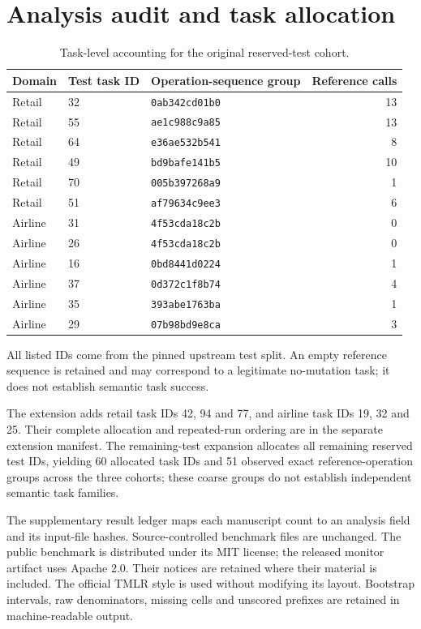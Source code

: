 \section{Analysis audit and task allocation}
\begin{table}[htbp]\centering\caption{Task-level accounting for the original reserved-test cohort.}\label{tab:earlier-tasks}
\begin{center}
\begin{tabular}{lllr}
\toprule
Domain & Test task ID & Operation-sequence group & Reference calls\\
\midrule
Retail & 32 & \texttt{0ab342cd01b0} & 13\\
Retail & 55 & \texttt{ae1c988c9a85} & 13\\
Retail & 64 & \texttt{e36ae532b541} & 8\\
Retail & 49 & \texttt{bd9bafe141b5} & 10\\
Retail & 70 & \texttt{005b397268a9} & 1\\
Retail & 51 & \texttt{af79634c9ee3} & 6\\
Airline & 31 & \texttt{4f53cda18c2b} & 0\\
Airline & 26 & \texttt{4f53cda18c2b} & 0\\
Airline & 16 & \texttt{0bd8441d0224} & 1\\
Airline & 37 & \texttt{0d372c1f8b74} & 4\\
Airline & 35 & \texttt{393abe1763ba} & 1\\
Airline & 29 & \texttt{07b98bd9e8ca} & 3\\
\bottomrule
\end{tabular}
\end{center}
All listed IDs come from the pinned upstream test split. An empty reference sequence is retained and may correspond to a legitimate no-mutation task; it does not establish semantic task success.

\end{table}
The extension adds retail task IDs 42, 94 and 77, and airline task IDs 19, 32 and 25. Their complete allocation and repeated-run ordering are in the separate extension manifest. The remaining-test expansion allocates all remaining reserved test IDs, yielding 60 allocated task IDs and 51 observed exact reference-operation groups across the three cohorts; these coarse groups do not establish independent semantic task families.

The supplementary result ledger maps each manuscript count to an analysis field and its input-file hashes. Source-controlled benchmark files are unchanged. The public benchmark is distributed under its MIT license; the released monitor artifact uses Apache 2.0. Their notices are retained where their material is included. The official TMLR style is used without modifying its layout. Bootstrap intervals, raw denominators, missing cells and unscored prefixes are retained in machine-readable output.

